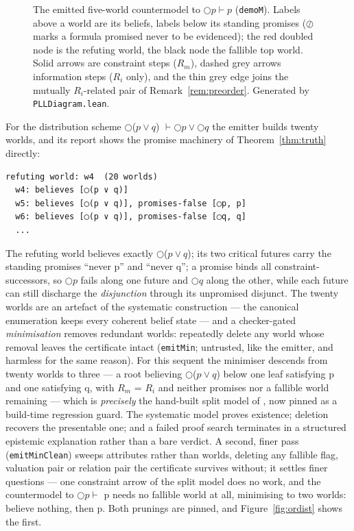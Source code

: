 \begin{figure}
\centering

\caption{The emitted five-world countermodel to
\ensuremath{\bigcirc p \vdash p} (\texttt{demoM}). Labels above a world
are its beliefs, labels below its standing promises
(\ensuremath{\oslash} marks a formula promised never to be evidenced);
the red doubled node is the refuting world, the black node the fallible
top world. Solid arrows are constraint steps (\ensuremath{R_{m}}), dashed
grey arrows information steps (\ensuremath{R_{i}} only), and the thin
grey edge joins the mutually \ensuremath{R_{i}}-related pair of
Remark~\ref{rem:preorder}. Generated by \texttt{PLLDiagram.lean}.}
\label{fig:demoM}
\end{figure}

For the distribution scheme \ensuremath{\bigcirc}(\ensuremath{p \vee q}) \ensuremath{\vdash \bigcirc p \vee \bigcirc q} the emitter builds
twenty worlds, and its report shows the promise machinery of
Theorem~\ref{thm:truth} directly:

\begin{lstlisting}
refuting world: w4  (20 worlds)
  w4: believes [◯(p ∨ q)]
  w5: believes [◯(p ∨ q)], promises-false [◯p, p]
  w6: believes [◯(p ∨ q)], promises-false [◯q, q]
  ...
\end{lstlisting}

The refuting world believes exactly \ensuremath{\bigcirc}(\ensuremath{p \vee q}); its two critical futures
carry the standing promises ``never p'' and ``never q''; a promise binds
all constraint-successors, so \ensuremath{\bigcirc p} fails along one future and \ensuremath{\bigcirc q} along the
other, while each future can still discharge the \emph{disjunction} through
its unpromised disjunct. The twenty worlds are an artefact of the
systematic construction --- the canonical enumeration keeps every
coherent belief state --- and a checker-gated \emph{minimisation} removes redundant
worlds: repeatedly delete any world whose removal leaves the
certificate intact (\texttt{emitMin}; untrusted, like the emitter, and
harmless for the same reason). For this sequent the minimiser descends
from twenty worlds to three --- a root believing \ensuremath{\bigcirc}(\ensuremath{p \vee q}) below one leaf
satisfying p and one satisfying q, with \ensuremath{R_{m}} = \ensuremath{R_{i}} and neither promises
nor a fallible world remaining --- which is \emph{precisely} the hand-built
split model of \cite[Fig.~3]{FairtloughMendler1997}, now pinned as a build-time
regression guard. The systematic model proves existence; deletion
recovers the presentable one; and a failed proof search terminates in
a structured epistemic explanation rather than a bare verdict. A
second, finer pass (\texttt{emitMinClean}) sweeps attributes rather than
worlds, deleting any fallible flag, valuation pair or relation pair the
certificate survives without; it settles finer questions --- one constraint arrow of the split model does no work,
and the countermodel to \ensuremath{\bigcirc p \vdash} p needs no fallible world at all,
minimising to two worlds: believe nothing, then p. Both prunings are
pinned, and Figure~\ref{fig:ordist} shows the first.

